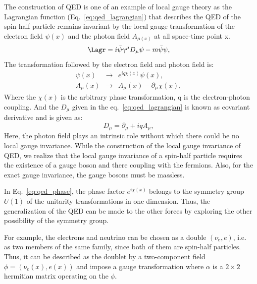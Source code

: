 The construction of QED is one of an example of local gauge theory as the Lagrangian function (Eq.~\ref{eq:qed_lagrangian}) that describes the QED of the spin-half particle remains invariant by the local gauge transformation of the electron field $\psi(x)$ and the photon field $A_{\mu(x)}$ at all space-time point x.
\begin{equation}\label{eq:qed_lagrangian}
    \Lagr = i \bar{\psi}\gamma^{\mu} D_{\mu}\psi - m\bar{\psi}\psi,
\end{equation}
The transformation followed by the electron field and photon field is:
\begin{eqnarray}\label{eq:qed_phase}
    \psi(x) & \rightarrow & e^{iq\chi(x)}\psi(x), \nonumber \\
    A_\mu(x) & \rightarrow & A_\mu(x) - {\partial_\mu \chi(x)}, 
\end{eqnarray}
Where the $\chi(x)$ is the arbitrary phase transformation, q is the electron-photon coupling.
And the $D_{\mu}$ given in the eq.~\ref{eq:qed_lagrangian} is known as covariant derivative and is given as:
\begin{equation}
    D_{\mu} = \partial_{\mu} + iqA_{\mu},
\end{equation}
Here, the photon field plays an intrinsic role without which there could be no local gauge invariance. While the construction of the local gauge invariance of QED, we realize that the local gauge invariance of a spin-half particle requires the existence of a gauge boson and there coupling with the fermions. Also, for the exact gauge invariance, the gauge bosons must be massless. 

In Eq.~\ref{eq:qed_phase}, the phase factor $e^{i\chi(x)}$ belongs to the symmetry group $U(1)$ of the unitarity transformations in one dimension. Thus, the generalization of the QED can be made to the other forces by exploring the other possibility of the symmetry group.

For example, the electrons and neutrino can be chosen as a double $(\nu_e,e)$, i.e. as two members of the same family, since both of them are spin-half particles.
Thus, it can be described as the doublet by a two-component field $\phi = (\nu_e(x),e(x))$ and impose a gauge transformation where $\alpha$ is a $2\times 2$ hermitian matrix operating on the $\phi$.


